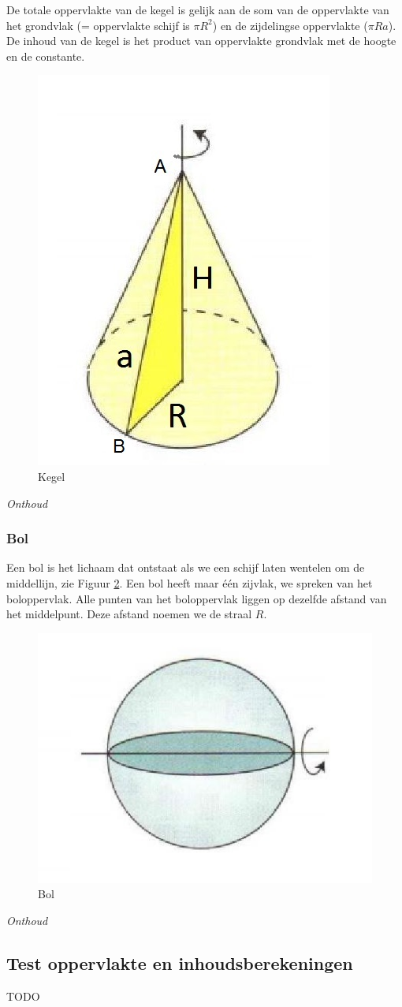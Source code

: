 De totale oppervlakte van de kegel is gelijk aan de som van de oppervlakte van het grondvlak (= oppervlakte schijf is $\pi R^2$) en de zijdelingse oppervlakte ($\pi R a$). De inhoud van de kegel is het product van oppervlakte grondvlak met de hoogte en de constante.

\begin{figure}[h]
	\centering
	\includegraphics[width=0.3\linewidth]{4_opp_inhoud_an_meetk/inputs/RuimteFigurenOppInhoud_kegel1}
	\caption{Kegel}
	\label{fig:ruimtefigurenoppinhoudkegel1}
\end{figure}


\emph{Onthoud}


\subsubsection{Bol}
Een bol is het lichaam dat ontstaat als we een schijf laten wentelen om de middellijn, zie Figuur \ref{fig:ruimtefigurenoppinhoudbol1}. Een bol heeft maar \'e\'en zijvlak, we spreken van het boloppervlak. Alle punten van het boloppervlak liggen op dezelfde afstand van het middelpunt. Deze afstand noemen we de straal $R$.

\begin{figure}[h]
	\centering
	\includegraphics[width=0.3\linewidth]{4_opp_inhoud_an_meetk/inputs/RuimteFigurenOppInhoud_bol1}
	\caption{Bol}
	\label{fig:ruimtefigurenoppinhoudbol1}
\end{figure}


\emph{Onthoud}



\subsection{Test oppervlakte en inhoudsberekeningen}
TODO